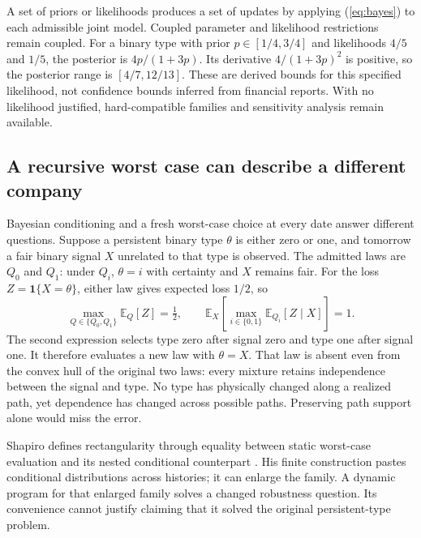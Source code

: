 \documentclass[11pt,a4paper]{article}
\newcommand{\E}{\mathbb E}
\newcommand{\ind}{\mathbf 1}
\begin{document}
A set of priors or likelihoods produces a set of updates by applying
(\ref{eq:bayes}) to each admissible joint model. Coupled parameter and
likelihood restrictions remain coupled. For a binary type with prior
$p\in[1/4,3/4]$ and likelihoods $4/5$ and $1/5$, the posterior is
$4p/(1+3p)$. Its derivative $4/(1+3p)^2$ is positive, so the posterior range
is $[4/7,12/13]$. These are derived bounds for this specified likelihood,
not confidence bounds inferred from financial reports. With no likelihood
justified, hard-compatible families and sensitivity analysis remain available.

\subsection{A recursive worst case can describe a different company}
Bayesian conditioning and a fresh worst-case choice at every date answer
different questions. Suppose a persistent binary type $\theta$ is either zero
or one, and tomorrow a fair binary signal $X$ unrelated to that type is observed.
The admitted laws are $Q_0$ and $Q_1$: under $Q_i$, $\theta=i$ with certainty
and $X$ remains fair. For the loss $Z=\ind\{X=\theta\}$, either law gives
expected loss $1/2$, so
\begin{equation}
\max_{Q\in\{Q_0,Q_1\}}\E_Q[Z]=\tfrac12,\qquad
\E_X\!\left[\max_{i\in\{0,1\}}\E_{Q_i}[Z\mid X]\right]=1.
\end{equation}
The second expression selects type zero after signal zero and type one after
signal one. It therefore evaluates a new law with $\theta=X$. That law is
absent even from the convex hull of the original two laws: every mixture
retains independence between the signal and type. No type has physically
changed along a realized path, yet dependence has changed across possible
paths. Preserving path support alone would miss the error.

Shapiro defines rectangularity through equality between static worst-case
evaluation and its nested conditional counterpart
\cite[Definition~2.1, Theorem~2.1 and proof, Section~5]{shapiro}.
His finite construction pastes conditional distributions across histories; it
can enlarge the family. A dynamic program for that enlarged family solves
a changed robustness question. Its convenience cannot justify claiming that
it solved the original persistent-type problem.
\end{document}
